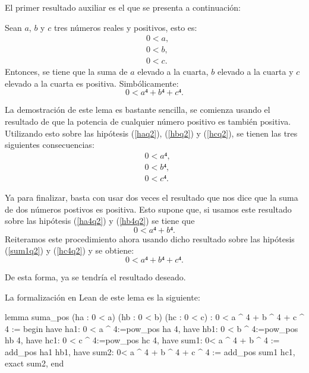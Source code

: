 El primer resultado auxiliar es el que se presenta a continuación:

\begin{lema}\label{lemasuma}
  Sean \(a\), \(b\) y \(c\) tres números reales y positivos, esto es:
  \begin{align}
    &0<a, \label{haq2}\tag{ha}\\
    &0<b, \label{hbq2}\tag{hb}\\
    &0<c. \label{hcq2}\tag{hc}
  \end{align}
  Entonces, se tiene que la suma de \(a\) elevado a la cuarta, \(b\)
  elevado a la cuarta y \(c\) elevado a la cuarta es positiva.
  Simbólicamente:
  \begin{equation}
    0<a⁴+b⁴+c⁴.
  \end{equation}
\end{lema}
\begin{demostracion}
  La demostración de este lema es bastante sencilla, se comienza
  usando el resultado de que la potencia de cualquier número
  positivo es también positiva. Utilizando esto sobre las hipótesis
  (\ref{haq2}), (\ref{hbq2}) y (\ref{hcq2}), se tienen las tres
  siguientes consecuencias:
  \begin{align}
    &0<a⁴, \label{ha4q2}\tag{ha1}\\
    &0<b⁴, \label{hb4q2}\tag{hb1}\\
    &0<c⁴. \label{hc4q2}\tag{hc1}
  \end{align}

  Ya para finalizar, basta con usar dos veces el resultado que nos
  dice que la suma de dos números postivos es positiva. Esto supone
  que, si usamos este resultado sobre las hipótesis (\ref{ha4q2})
  y (\ref{hb4q2}) se tiene que
  \begin{equation}\label{sum1q2}\tag{sum1}
    0<a⁴+b⁴.
  \end{equation}
  Reiteramos este procedimiento ahora usando dicho resultado sobre
  las hipótesis (\ref{sum1q2}) y (\ref{hc4q2}) y se obtiene:
  \begin{equation}\tag{sum2}
    0<a⁴+b⁴+c⁴.
  \end{equation}

  De esta forma, ya se tendría el resultado deseado.
\end{demostracion}

La formalización en Lean de este lema es la siguiente:
\begin{leancode}
lemma suma_pos (ha : 0 < a) (hb : 0 < b) (hc : 0 < c) :
0 < a ^ 4 + b ^ 4 + c ^ 4 :=
begin
  have ha1: 0 < a ^ 4:=pow_pos ha 4,
  have hb1: 0 < b ^ 4:=pow_pos hb 4,
  have hc1: 0 < c ^ 4:=pow_pos hc 4,
  have sum1: 0< a ^ 4 + b ^ 4 := add_pos ha1 hb1,
  have sum2: 0< a ^ 4 + b ^ 4 + c ^ 4 := add_pos sum1 hc1,
  exact sum2,
end
\end{leancode}

